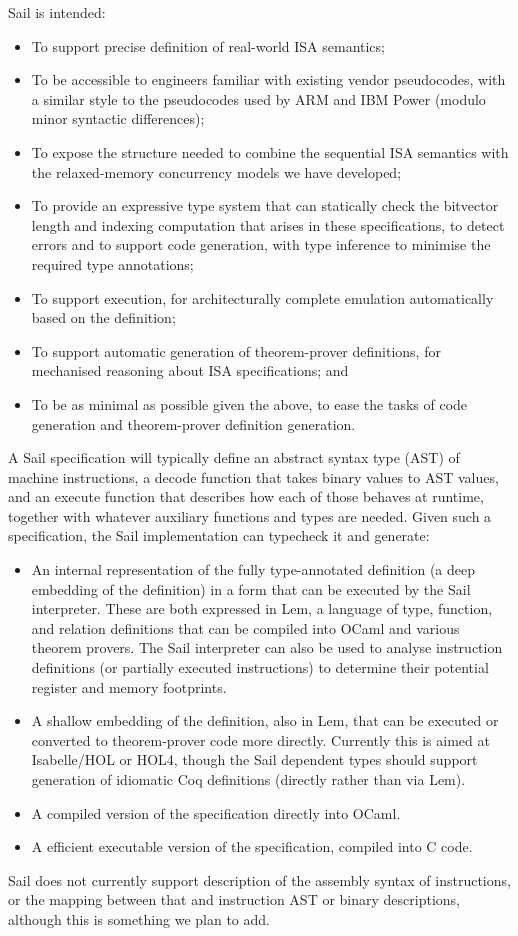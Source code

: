 Sail is intended:
\begin{itemize}
\item To support precise definition of real-world ISA semantics;
\item To be accessible to engineers familiar with existing vendor
  pseudocodes, with a similar style to the pseudocodes used by ARM and IBM Power
  (modulo minor syntactic differences);
\item To expose the structure needed to combine the sequential ISA
  semantics with the relaxed-memory concurrency models we have
  developed;
\item To provide an expressive type system that can statically check
  the bitvector length and indexing computation that arises in these
  specifications, to detect errors and to support code generation,
  with type inference to minimise the required type annotations;
\item To support execution, for architecturally complete emulation
  automatically based on the definition;
\item To support automatic generation of theorem-prover definitions, for
  mechanised reasoning about ISA specifications; and
\item To be as minimal as possible given the above, to ease the tasks
  of code generation and theorem-prover definition generation.
\end{itemize}

A Sail specification will typically define an abstract syntax type
(AST) of machine instructions, a decode function that takes binary
values to AST values, and an execute function that describes how each
of those behaves at runtime, together with whatever auxiliary
functions and types are needed.
%
Given such a specification, the Sail implementation can typecheck it
and generate:
\begin{itemize}
\item An internal representation of the fully type-annotated
  definition (a deep embedding of the definition) in a form that can
  be executed by the Sail interpreter.  These are both expressed in
  Lem, a language of type, function, and
  relation definitions that can be compiled into OCaml and various
  theorem provers. The Sail interpreter can also be used to analyse
  instruction definitions (or partially executed instructions) to
  determine their potential register and memory footprints.
\item A shallow embedding of the definition, also in Lem, that can be
  executed or converted to theorem-prover code more directly.
Currently this is aimed at Isabelle/HOL or HOL4, though the Sail
dependent types should support generation of idiomatic Coq definitions
(directly rather than via Lem).
\item A compiled version of the specification
  directly into OCaml.
\item A efficient executable version of the specification, compiled
  into C code.
\end{itemize}
Sail does not currently support description of the assembly syntax of
instructions, or the mapping between that and instruction AST or
binary descriptions, although this is something we plan to add.

